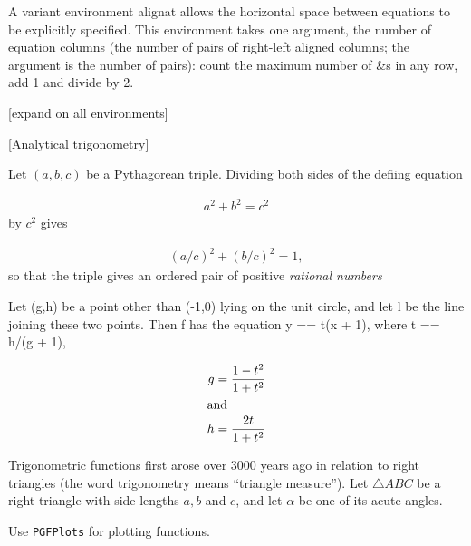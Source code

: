 {A variant environment alignat allows the horizontal space between equations
to be explicitly specified. This environment takes one argument, the number
of equation columns (the number of pairs of right-left aligned columns; the
argument is the number of pairs): count the maximum number of \&s in any row,
add 1 and divide by 2.

[expand on all environments]

[Analytical trigonometry]




Let $(a,b,c)$ be a Pythagorean triple. Dividing both sides of the defiing equation

\begin{gather}
  a^2 + b^2 = c^2
\end{gather}
by $c^2$ gives

\begin{gather}
(a/c)^2 + (b/c)^2 = 1,
\end{gather}
so that the triple gives an ordered pair of positive \emph{rational numbers}

\begin{lemma} Let (g,h) be a point other than (-1,0) lying on the unit circle, 
and let l be the line joining these two points. Then f has the equation y == 
t(x + 1), where t == h/(g + 1), 

\begin{align}
  g &= \frac{1-t^2}{1+t^2}\\
\intertext{and}  
 h  &= \frac{2t}{1+t^2}
\end{align}

\end{lemma}

Trigonometric functions first arose over 3000 years ago in relation to 
right triangles (the word trigonometry means \enquote{triangle measure}). 
Let $\triangle ABC$ be a right triangle with side lengths $a, b$ and $c$, and let $\alpha$ 
be one of its acute angles. 



\begin{Rule} Use \texttt{PGFPlots} for plotting functions.
\end{Rule}


}

